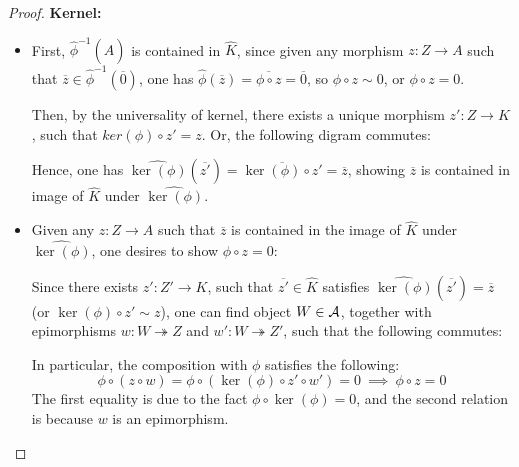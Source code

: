 \documentclass{article}
\begin{document}
\begin{proof}
    \textbf{Kernel:}

    \begin{itemize}
        \item[$\subseteq$:] First, $\hat{\phi}^{-1}(\hat{A})$ is contained in $\hat{K}$, since given any morphism $z:Z\rightarrow A$ such that $\overline{z}\in \hat{\phi}^{-1}(\overline{0})$, one has $\hat{\phi}(\overline{z})=\overline{\phi\circ z}=\overline{0}$, so $\phi\circ z \sim 0$, or $\phi\circ z=0$.
        
        Then, by the universality of kernel, there exists a unique morphism $z':Z\rightarrow K$, such that $ker(\phi)\circ z' = z$. Or, the following digram commutes:
        \begin{center}
        \end{center}
        Hence, one has $\hat{\ker(\phi)}(\overline{z'}) = \overline{\ker(\phi)\circ z'}=\overline{z}$, showing $\overline{z}$ is contained in image of $\hat{K}$ under $\hat{\ker(\phi)}$.

        \item[$\supseteq$:] Given any $z:Z\rightarrow A$ such that $\overline{z}$ is contained in the image of $\hat{K}$ under $\hat{\ker(\phi)}$, one desires to show $\phi\circ z=0$:
        
        Since there exists $z':Z'\rightarrow K$, such that $\overline{z'}\in\hat{K}$ satisfies $\hat{\ker(\phi)}(\overline{z'})=\overline{z}$ (or $\ker(\phi)\circ z'\sim z$), one can find object $W\in\cal{A}$, together with epimorphisms $w:W\twoheadrightarrow Z$ and $w':W\twoheadrightarrow Z'$, such that the following commutes:
        \begin{center}
        \end{center}
        In particular, the composition with $\phi$ satisfies the following:
        $$\phi\circ (z\circ w) = \phi \circ (\ker(\phi)\circ z'\circ w') = 0\ \implies\ \phi\circ z=0$$
        The first equality is due to the fact $\phi\circ\ker(\phi)=0$, and the second relation is because $w$ is an epimorphism.


\end{itemize}
\end{proof}
\end{document}
